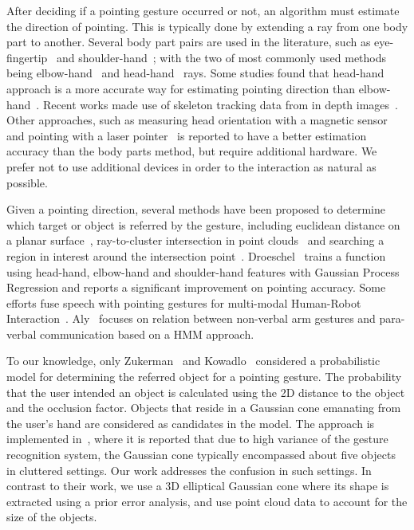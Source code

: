 \documentclass[12pt]{gatech-thesis}
\begin{document}
After deciding if a pointing gesture occurred or not, an algorithm must estimate the direction of pointing. This is typically done by extending a ray from one body part to another. Several body part pairs are used in the literature, such as eye-fingertip~\cite{kehl2004real} and shoulder-hand~\cite{hosoya2004arm}; with the two of most commonly used methods being elbow-hand~\cite{raza2013human, brooks2006working, blodow2011inferring} and head-hand~\cite{bennewitz2008robust, schmidt2008interacting} rays. Some studies found that head-hand approach is a more accurate way for estimating pointing direction than elbow-hand~\cite{quintero2013sepo, droeschel2011towards}. Recent works made use of skeleton tracking data from in depth images~\cite{quintero2013sepo, blodow2011inferring, raza2013human}. Other approaches, such as measuring head orientation with a magnetic sensor~\cite{nickel2003pointing} and pointing with a laser pointer~\cite{cheng2009hand, kemp2008point} is reported to have a better estimation accuracy than the body parts method, but require additional hardware. We prefer not to use additional devices in order to the interaction as natural as possible.

Given a pointing direction, several methods have been proposed to determine which target or object is referred by the gesture, including euclidean distance on a planar surface~\cite{cheng2009hand}, ray-to-cluster intersection in point clouds~\cite{blodow2011inferring, quintero2013sepo} and searching a region in interest around the intersection point~\cite{schmidt2008interacting}. Droeschel~\cite{droeschel2011learning} trains a function using head-hand, elbow-hand and shoulder-hand features with Gaussian Process Regression and reports a significant improvement on pointing accuracy. Some efforts fuse speech with pointing gestures for multi-modal Human-Robot Interaction~\cite{aly2012integrated,kowadlo2010influence}. Aly~\cite{aly2012integrated} focuses on relation between non-verbal arm gestures and para-verbal communication based on a HMM approach.

To our knowledge, only Zukerman~\cite{zukerman2011speaking} and Kowadlo~\cite{kowadlo2010influence} considered a probabilistic model for determining the referred object for a pointing gesture. The probability that the user intended an object is calculated using the 2D distance to the object and the occlusion factor. Objects that reside in a Gaussian cone emanating from the user's hand are considered as candidates in the model. The approach is implemented in~\cite{zukerman2011speaking}, where it is reported that due to high variance of the gesture recognition system, the Gaussian cone typically encompassed about five objects in cluttered settings. Our work addresses the confusion in such settings. In contrast to their work, we use a 3D elliptical Gaussian cone where its shape is extracted using a prior error analysis, and use point cloud data to account for the size of the objects.
\end{document}
